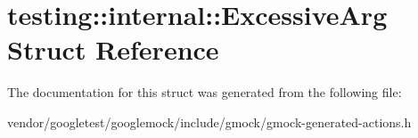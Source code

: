 \hypertarget{structtesting_1_1internal_1_1_excessive_arg}{}\section{testing\+:\+:internal\+:\+:Excessive\+Arg Struct Reference}
\label{structtesting_1_1internal_1_1_excessive_arg}


The documentation for this struct was generated from the following file\+:\begin{DoxyCompactItemize}
\item 
vendor/googletest/googlemock/include/gmock/gmock-\/generated-\/actions.\+h\end{DoxyCompactItemize}
